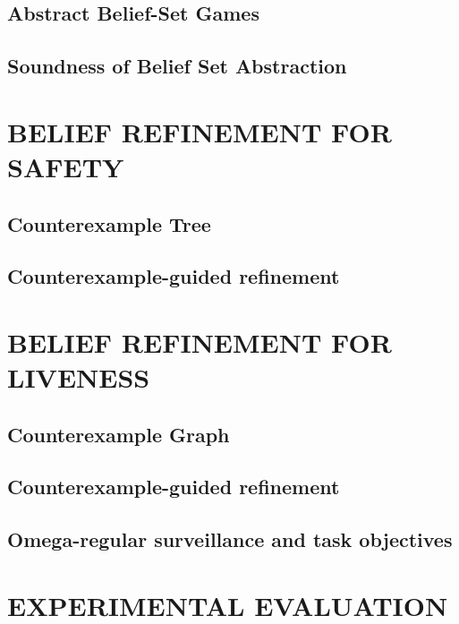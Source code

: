 \documentclass[letterpaper, 10 pt, conference]{ieeeconf}  %
\begin{document}
\subsection{Abstract Belief-Set Games}

\subsection{Soundness of Belief Set Abstraction}




\section{BELIEF REFINEMENT FOR SAFETY}%
\subsection{Counterexample Tree}

\subsection{Counterexample-guided refinement}



\section{BELIEF REFINEMENT FOR LIVENESS}%
\subsection{Counterexample Graph}

\subsection{Counterexample-guided refinement}

\subsection{Omega-regular surveillance and task objectives}



\section{EXPERIMENTAL EVALUATION}

\end{document}
